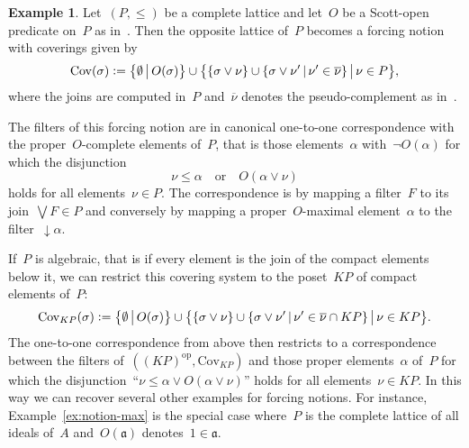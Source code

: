 \documentclass[com,11pt,crcready]{iosart2x}
\theoremstyle{definition}
\newtheorem{example}[definition]{Example}
\theoremstyle{plain}
\theoremstyle{remark}
\newcommand{\?}{\,{:}\,}
\newcommand{\aaa}{\mathfrak{a}}
\newcommand{\defeq}{\vcentcolon=}
\newcommand{\Cov}{\mathrm{Cov}}
\renewcommand{\_}{\mathpunct{.}\,}
\begin{document}
\begin{example}\label{ex:notion-scott}Let~$(P,{\leq})$ be a complete lattice and let~$O$
be a Scott-open predicate on~$P$ as in~\cite{wessel-schuster:radical}. Then the
opposite lattice of~$P$ becomes a forcing notion with coverings given by
\[
  \Cov(\sigma) \defeq \bigl\{ \emptyset \,\big|\, O(\sigma) \bigr\} \cup
    \bigl\{ \{ \sigma \vee \nu \} \cup \{ \sigma \vee \nu' \,|\, \nu' \in
    \overline{\nu} \} \,\big|\, \nu \in P \bigr\},
\]
where the joins are computed in~$P$ and~$\overline{\nu}$ denotes the pseudo-complement as
in~\cite[Equation~(6)]{wessel-schuster:radical}.

The filters of this forcing notion are in canonical one-to-one correspondence with
the proper~$O$-complete elements of~$P$, that is those elements~$\alpha$
with~$\neg O(\alpha)$ for which the disjunction
\[ \nu \leq \alpha \quad\text{or}\quad O(\alpha \vee \nu) \]
holds for all elements~$\nu \in P$. The correspondence is by mapping a
filter~$F$ to its join~$\bigvee F \in P$ and conversely by mapping
a proper~$O$-maximal element~$\alpha$ to the filter~${\downarrow}\alpha$.

If~$P$ is algebraic, that is if every element is the join of the compact
elements below it, we can restrict this covering system to the poset~$KP$ of
compact elements of~$P$:
\[
  \Cov_{KP}(\sigma) \defeq \bigl\{ \emptyset \,\big|\, O(\sigma) \bigr\} \cup
    \bigl\{ \{ \sigma \vee \nu \} \cup \{ \sigma \vee \nu' \,|\, \nu' \in
    \overline{\nu} \cap KP \} \,\big|\, \nu \in KP \bigr\}.
\]
The one-to-one correspondence from above then restricts to a correspondence
between the filters of~$((KP)^\mathrm{op},\mathrm{Cov}_{KP})$ and those proper
elements~$\alpha$ of~$P$ for which the disjunction~``$\nu \leq \alpha \vee
O(\alpha \vee \nu)$'' holds for all elements~$\nu \in KP$. In this way we can
recover several other examples for forcing notions. For instance,
Example~\ref{ex:notion-max} is the special case where~$P$ is the complete lattice
of all ideals of~$A$ and~$O(\aaa)$ denotes~$1 \in \aaa$.
\end{example}
\end{document}
